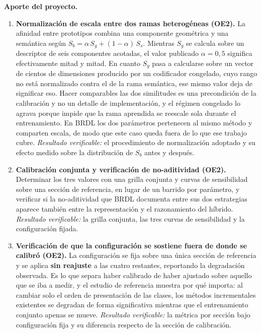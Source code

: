 \textbf{Aporte del proyecto.}

\begin{enumerate}
\item[\textbf{A5}] \textbf{Normalización de escala entre dos ramas heterogéneas
(OE2).} La afinidad entre prototipos combina una componente geométrica y una
semántica según $S_b=\alpha\,S_g+(1-\alpha)\,S_s$. Mientras $S_g$ se calcula
sobre un descriptor de seis componentes acotadas, el valor publicado
$\alpha=0{,}5$ significa efectivamente mitad y mitad. En cuanto $S_g$ pasa a
calcularse sobre un vector de cientos de dimensiones producido por un codificador
congelado, cuyo rango no está normalizado contra el de la rama semántica, ese
mismo valor deja de significar eso. Hacer comparables las dos similitudes es una
precondición de la calibración y no un detalle de implementación, y el régimen
congelado lo agrava porque impide que la rama aprendida se reescale sola durante
el entrenamiento. En BRDL los dos parámetros pertenecen al mismo método y
comparten escala, de modo que este caso queda fuera de lo que ese trabajo cubre.
\emph{Resultado verificable:} el procedimiento de normalización adoptado y su
efecto medido sobre la distribución de $S_b$ antes y después.

\item[\textbf{A6}] \textbf{Calibración conjunta y verificación de
no-aditividad (OE2).} Determinar los tres valores con una grilla
conjunta y curvas de sensibilidad sobre una sección de referencia, en lugar de un
barrido por parámetro, y verificar si la no-aditividad que BRDL documenta entre
sus dos estrategias aparece también entre la representación y el razonamiento del
híbrido. \emph{Resultado verificable:} la grilla conjunta, las tres curvas de
sensibilidad y la configuración fijada.

\item[\textbf{A7}] \textbf{Verificación de que la configuración se sostiene fuera
de donde se calibró (OE2).} La configuración se fija sobre una única sección de
referencia y se aplica \textbf{sin reajuste} a las cuatro restantes, reportando
la degradación observada. Es lo que separa haber calibrado de haber ajustado
sobre aquello que se iba a medir, y el estudio de referencia muestra por qué
importa: al cambiar solo el orden de presentación de las clases, los métodos
incrementales existentes se degradan de forma significativa mientras que el
entrenamiento conjunto apenas se mueve. \emph{Resultado verificable:} la métrica
por sección bajo configuración fija y su diferencia respecto de la sección de
calibración.
\end{enumerate}

